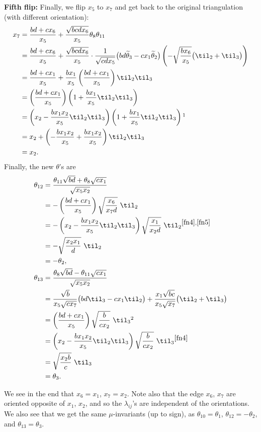 {\textbf{Fifth flip:} Finally, we flip $x_5$ to $x_7$ and get back to the original triangulation (with different orientation):
\begin{align*}
x_7&=	\frac{bd+cx_6}{x_5} + \frac{\sqrt{bcdx_6}}{x_5}\theta_8\theta_{11}\\
&=\frac{bd+cx_6}{x_5}+{\sqrt{bcdx_6}\over x_5}\cdot
\frac{1}{\sqrt{cdx_5}} \big( bd \widetilde{\theta}_3 - cx_1 \widetilde{\theta}_2 \big)\left(-\sqrt{b x_6\over x_5}\big(\til_2+\til_3\big)\right)\\
&=\frac{bd+cx_1}{x_5}+{bx_1\over x_5}\left(\frac{bd+cx_1}{x_5}\right)\til_2\til_3\\
&=\left(\frac{bd+cx_1}{x_5}\right)\left(1+{bx_1\over x_5}\til_2\til_3\right)\\
&=\left(x_2-\frac{bx_1x_2}{x_5}\til_2\til_3\right)\left(1+{bx_1\over x_5}\til_2\til_3\right)\footnotemark\\
&=x_2+\left(-{bx_1x_2\over x_5}+{bx_1x_2\over x_5}\right)\til_2\til_3\\
&=x_2.
\end{align*}
$\!\!$Finally, the new $\theta$'s are
\begin{align*}
\theta_{12}&={\theta_{11}\sqrt{bd}+\theta_8\sqrt{cx_1}\over {\sqrt{x_5x_2}}}\\
&=-\left({bd+cx_1}\over{x_5} \right)\sqrt{x_6\over x_7d}\ \til_2\\	
&=-\left(x_2-\frac{bx_1x_2}{x_5}\til_2\til_3\right)\sqrt{x_1\over x_2d}\ \til_2 {}^{\ref{fn4},\ref{fn5} }	\\
&=-\sqrt{x_2x_1\over d}\ \til_2\\
&=-\theta_2,
\\
\theta_{13}&={\theta_{8}\sqrt{bd}-\theta_{11}\sqrt{cx_1}\over {\sqrt{x_5x_2}}}\\
&=\frac{\sqrt{b}}{x_5\sqrt{cx_7}}\big(bd\til_3-cx_1\til_2\big)+\frac{x_1\sqrt{bc}}{x_5\sqrt{x_7}}\big(\til_2+\til_3\big)\\
&=\left(bd+cx_1\over x_5\right)\sqrt{b\over cx_2}\ \til_3 \footnotemark\\
&=\left(x_2-\frac{bx_1x_2}{x_5}\til_2\til_3\right)\sqrt{b\over cx_2}\ \til_3{}^{\ref{fn4} }\\
&=\sqrt{x_2b\over c}\ \til_3\\
&=\theta_3.
\end{align*}

We see in the end that $x_6 = x_1$, $x_7=x_2$. Note also that the edge $x_6$, $x_7$ are oriented opposite of $x_1$, $x_2$, and so the $\lambda_{ij}$'s
are independent of the orientations. We also see that we get the same $\mu$-invariants (up to sign), as $\theta_{10} = \theta_1$,
$\theta_{12} = -\theta_2$, and $\theta_{13} = \theta_3$.

}
